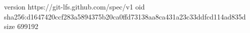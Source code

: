 version https://git-lfs.github.com/spec/v1
oid sha256:d1647420ccf283a5894375b20ca0ffd73138aa8ca431a23c33ddfcd114ad835d
size 699192
